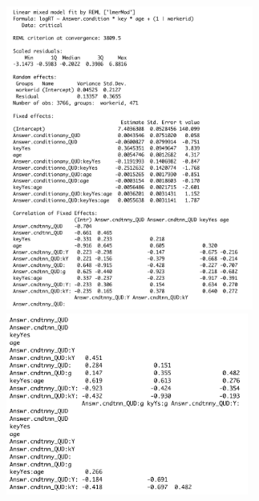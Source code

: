 \documentclass[12pt]{article}
\begin{document}
\begin{enumerate}
\includegraphics[height=10cm]{models/exp3_model2_1.pdf} \\
\includegraphics[height=6cm]{models/exp3_model2_2.pdf}
\end{enumerate}


\pagebreak


\end{document}
